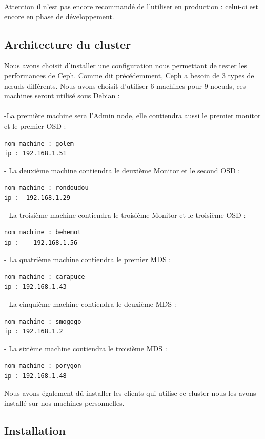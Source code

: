 \documentclass[12pt]{article}
\begin{document}
Attention il n'est pas encore recommandé de l'utiliser en production : celui-ci est encore en phase de développement.
\newpage
	\subsection{Architecture du cluster}
	Nous avons choisit d'installer une configuration nous permettant de tester les performances de Ceph. Comme dit précédemment, Ceph a besoin de 3 types de nœuds différents. Nous avons choisit d'utiliser 6 machines pour 9 noeuds, ces machines seront utilisé sous Debian :
\\\\-La première machine sera l'Admin node, elle contiendra aussi le premier monitor et le premier OSD :
\begin{verbatim}
nom machine : golem
ip : 192.168.1.51
\end{verbatim}

- La deuxième machine contiendra le deuxième Monitor et le second OSD :
\begin{verbatim}
nom machine : rondoudou 
ip :  192.168.1.29
\end{verbatim}

- La troisième machine contiendra le troisième Monitor et le troisième OSD :
\begin{verbatim}
nom machine : behemot
ip :    192.168.1.56
\end{verbatim}

- La quatrième machine contiendra le premier MDS :
\begin{verbatim}
nom machine : carapuce 
ip : 192.168.1.43
\end{verbatim}

- La cinquième machine contiendra le deuxième MDS :
\begin{verbatim}
nom machine : smogogo
ip : 192.168.1.2
\end{verbatim}

- La sixième machine contiendra le troisième MDS :
\begin{verbatim}
nom machine : porygon
ip : 192.168.1.48
\end{verbatim}

Nous avons également dû installer les clients qui utilise ce cluster nous les avons installé sur nos machines personnelles.

	\subsection{Installation}
	
\end{document}
